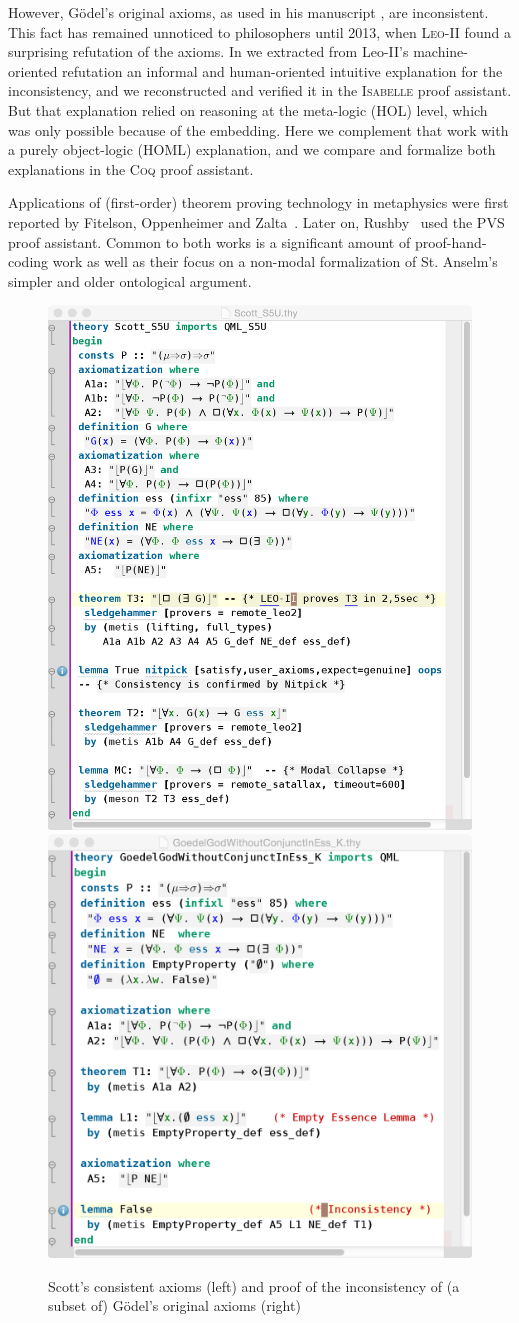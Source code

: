 \documentclass{llncs}
\newcommand{\logic}[1]{\textbf{#1}\xspace}
\newcommand{\SFiveU}{\logic{S5\textsuperscript{U}}}
\begin{document}
However, G\"odel's original axioms, as used in his
manuscript \cite{GoedelNotes}, are inconsistent. This fact has
remained unnoticed to philosophers until 2013, 
when \textsc{Leo-II} \cite{J30} found a surprising refutation of the axioms.
In \cite{C55} we extracted from Leo-II's machine-oriented refutation an informal and human-oriented intuitive explanation for the inconsistency, and we reconstructed and
verified it in the \textsc{Isabelle} proof assistant. But that explanation relied on reasoning at the meta-logic (HOL) level, which was only possible because of the embedding. Here we complement that work with a purely object-logic (HOML) explanation, and we compare and formalize both explanations in the \textsc{Coq} proof assistant.

Applications of (first-order) theorem proving technology in
metaphysics were first reported by Fitelson, Oppenheimer and
Zalta~\cite{FitelsonZalta,oppenheimer11}. 
Later on, Rushby~\cite{rushby13} used the \textsc{PVS} proof
assistant. Common to both works is a
significant amount of proof-hand-coding work as well as their focus on
a non-modal formalization of St. Anselm's simpler
and older ontological argument.


\begin{figure}\centering 
  \includegraphics[width=.495\textwidth]{./Scott_S5U.png}
  \includegraphics[width=.495\textwidth]{./InconsistencyIsabelleK.png}
\caption{Scott's consistent axioms (left) and proof of the
  inconsistency of (a subset of) G\"odel's original  axioms (right)}
\label{Scott_Goedel}
\end{figure} 
\end{document}
